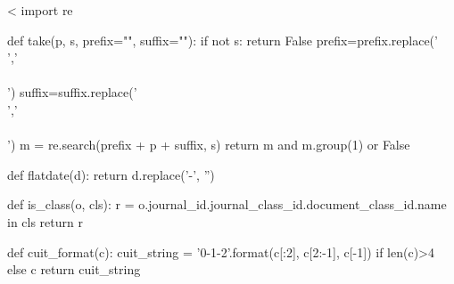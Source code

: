 \documentclass{article}
\begin{document}
<%
    import re

    def take(p, s, prefix="", suffix=""):
        if not s: return False
	prefix=prefix.replace('\\','\\\\')
	suffix=suffix.replace('\\','\\\\')
        m = re.search(prefix + p + suffix, s)
        return m and m.group(1) or False

    def flatdate(d):
        return d.replace('-', '')

    def is_class(o, cls):
        r = o.journal_id.journal_class_id.document_class_id.name in cls
        return r

    def cuit_format(c):
	cuit_string = '{0}-{1}-{2}'.format(c[:2], c[2:-1], c[-1]) if len(c)>4 else c
        return cuit_string



\end{document}
